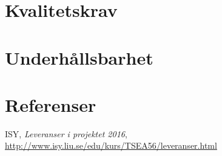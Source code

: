 \documentclass[11pt]{article}
\begin{document}
\begin{flushleft}
\section{Kvalitetskrav}

\section{Underhållsbarhet}


\pagebreak
\section{Referenser}

\begin{thebibliography}{9}
ISY,
\emph{Leveranser i projektet 2016},
\url{http://www.isy.liu.se/edu/kurs/TSEA56/leveranser.html}
	
\end{thebibliography}



\end{flushleft}
\end{document}

